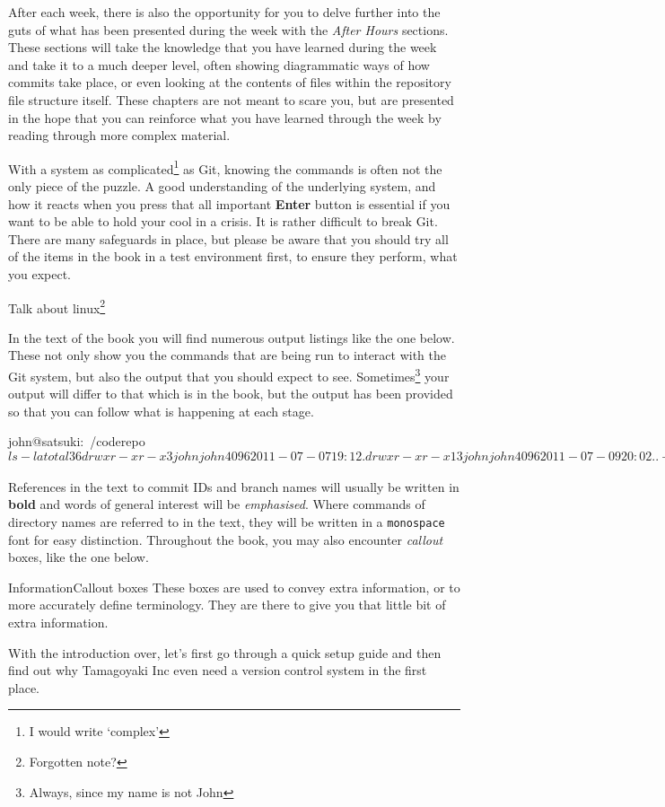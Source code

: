 After each week, there is also the opportunity for you to delve further into the guts of what has been presented during the week with the \emph{After Hours} sections.
These sections will take the knowledge that you have learned during the week and take it to a much deeper level, often showing diagrammatic ways of how commits take place, or even looking at the contents of files within the repository file structure itself.
These chapters are not meant to scare you, but are presented in the hope that you can reinforce what you have learned through the week by reading through more complex material.

With a system as complicated\footnote{I would write `complex'} as Git, knowing the commands is often not the only piece of the puzzle.
A good understanding of the underlying system, and how it reacts when you press that all important \textbf{Enter} button is essential if you want to be able to hold your cool in a crisis.
It is rather difficult to break Git.
There are many safeguards in place, but please be aware that you should try all of the items in the book in a test environment first, to ensure they perform, what you expect.

Talk about linux\footnote{Forgotten note?}

In the text of the book you will find numerous output listings like the one below.
These not only show you the commands that are being run to interact with the Git system, but also the output that you should expect to see.
Sometimes\footnote{Always, since my name is not John} your output will differ to that which is in the book, but the output has been provided so that you can follow what is happening at each stage.

\begin{code}
john@satsuki:~/coderepo$ ls -la
total 36
drwxr-xr-x  3 john john 4096 2011-07-07 19:12 .
drwxr-xr-x 13 john john 4096 2011-07-09 20:02 ..
-rw-r--r--  1 john john   35 2011-07-07 19:12 another_file
-rw-r--r--  1 john john   25 2011-07-07 19:12 cont_dev
drwxrwxr-x  8 john john 4096 2011-07-07 19:17 .git
-rw-r--r--  1 john john    8 2011-03-31 22:15 temp_file
john@satsuki:~/coderepo$
\end{code}

References in the text to commit IDs and branch names will usually be written in \textbf{bold} and words of general interest will be \emph{emphasised}.
Where commands of directory names are referred to in the text, they will be written in a \texttt{monospace} font for easy distinction.
Throughout the book, you may also encounter \emph{callout} boxes, like the one below.

\begin{callout}{Information}{Callout boxes}
These boxes are used to convey extra information, or to more accurately define terminology.
They are there to give you that little bit of extra information.
\end{callout}

With the introduction over, let's first go through a quick setup guide and then find out why Tamagoyaki Inc even need a version control system in the first place.
